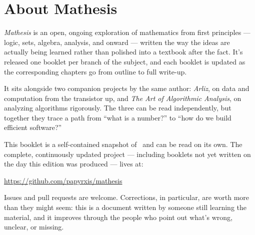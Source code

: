 \chapter*{About Mathesis}

\textit{Mathesis} is an open, ongoing exploration of mathematics from
first principles --- logic, sets, algebra, analysis, and onward ---
written the way the ideas are actually being learned rather than
polished into a textbook after the fact. It's released one booklet per
branch of the subject, and each booklet is updated as the corresponding
chapters go from outline to full write-up.

It sits alongside two companion projects by the same author: \textit{Arliz},
on data and computation from the transistor up, and \textit{The Art of
Algorithmic Analysis}, on analyzing algorithms rigorously. The three can
be read independently, but together they trace a path from ``what is a
number?'' to ``how do we build efficient software?''

This booklet is a self-contained snapshot of \BookletSubtitle\ and can be
read on its own. The complete, continuously updated project --- including
booklets not yet written on the day this edition was produced --- lives
at:

\begin{center}
  \url{https://github.com/papyrxis/mathesis}
\end{center}

Issues and pull requests are welcome. Corrections, in particular, are
worth more than they might seem: this is a document written by someone
still learning the material, and it improves through the people who
point out what's wrong, unclear, or missing.
